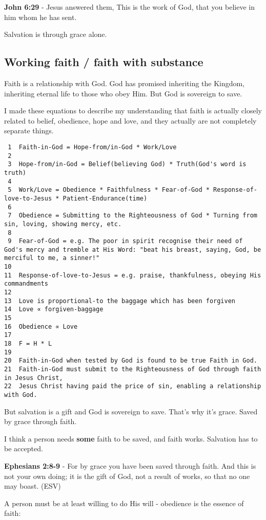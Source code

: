 \documentclass[11pt]{article}
\begin{document}
\textbf{John 6:29} - Jesus answered them, This is the work of God, that you believe in him whom he has sent.

Salvation is through grace alone.

\subsection{Working faith / faith with substance}
\label{sec:orga21a5a8}

Faith is a relationship with God. God has promised inheriting the Kingdom, inheriting eternal life to those who obey Him. But God is sovereign to save.

I made these equations to describe my understanding that faith is actually closely related to belief, obedience, hope and love, and they actually are not completely separate things.

\begin{verbatim}
 1  Faith-in-God = Hope-from/in-God * Work/Love
 2  
 3  Hope-from/in-God = Belief(believing God) * Truth(God's word is truth)
 4  
 5  Work/Love = Obedience * Faithfulness * Fear-of-God * Response-of-love-to-Jesus * Patient-Endurance(time)
 6  
 7  Obedience = Submitting to the Righteousness of God * Turning from sin, loving, showing mercy, etc.
 8  
 9  Fear-of-God = e.g. The poor in spirit recognise their need of God's mercy and tremble at His Word: "beat his breast, saying, God, be merciful to me, a sinner!"
10  
11  Response-of-love-to-Jesus = e.g. praise, thankfulness, obeying His commandments
12  
13  Love is proportional-to the baggage which has been forgiven
14  Love ∝ forgiven-baggage
15  
16  Obedience ∝ Love
17  
18  F = H * L
19  
20  Faith-in-God when tested by God is found to be true Faith in God.
21  Faith-in-God must submit to the Righteousness of God through faith in Jesus Christ,
22  Jesus Christ having paid the price of sin, enabling a relationship with God.
\end{verbatim}

But salvation is a gift and God is sovereign to save.
That's why it's grace.
Saved by grace through faith.

I think a person needs \textbf{some} faith to be saved, and faith works. Salvation has to be accepted.

\textbf{Ephesians 2:8-9} - For by grace you have been saved through faith. And this is not your own doing; it is the gift of God, not a result of works, so that no one may boast. (ESV)

A person must be at least willing to do His will - obedience is the essence of faith:
\end{document}
